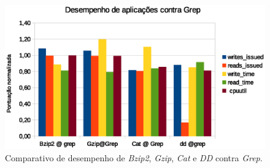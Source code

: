 \begin{figure}[!h]
\centering
\includegraphics [keepaspectratio=true,scale=1.0]{graficos/comparative_performance.eps}
\caption{Comparativo de desempenho de \textit{Bzip2}, \textit{Gzip}, \textit{Cat} e \textit{DD} contra \textit{Grep}.}
\label{comparative_performance}
\end{figure}   



  

